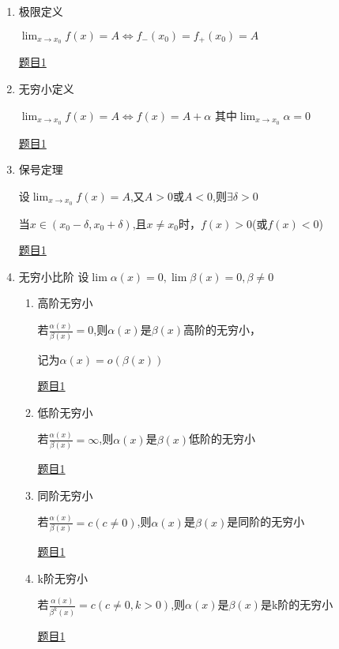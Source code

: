 \documentclass[12pt]{article} %
\begin{document}
\begin{enumerate}
\item 极限定义 
    \par $\displaystyle\lim _{x \rightarrow x_{0}} f(x)=A \Leftrightarrow f_{-}\left(x_{0}\right)=f_{+}\left(x_{0}\right)=A$
    \par \href{https://www.matongxue.com/matex/2576/react/}{题目1}
\item 无穷小定义
    \par $\displaystyle\lim _{x \rightarrow x_{0}} f(x)=A \Leftrightarrow f\left(x\right)=A+\alpha$
    其中$\displaystyle\lim_{x\to x_0}\alpha=0$
    \par \href{https://www.matongxue.com/matex/2575/react/}{题目1} 
\item 保号定理
     \par 设$\displaystyle\lim_{x\to x_0}f(x)=A$,又$A > 0$或$A < 0$,则$\exists\delta > 0$
     \par 当$x\in(x_0-\delta,x_0+\delta)$,且$x\neq x_0$时，$f(x)>0$(或$f(x)<0$)
     \par \href{https://www.matongxue.com/matex/2578/react/}{题目1} 
\item 无穷小比阶
    设$\lim\alpha(x)=0,\lim\beta(x)=0,\beta\neq 0$
    \begin{enumerate}
        \item 高阶无穷小
        \par 若$\displaystyle\frac{\alpha(x)}{\beta(x)}=0$,则$\alpha(x)$是$\beta(x)$高阶的无穷小，
        \par 记为$\alpha(x)=o(\beta(x))$ \quad 
        \par \href{https://www.matongxue.com/matex/2579/react/}{题目1} 
        \item 低阶无穷小
        \par 若$\displaystyle\frac{\alpha(x)}{\beta(x)}=\infty$,则$\alpha(x)$是$\beta(x)$低阶的无穷小
        \par \href{https://www.matongxue.com/matex/2582/react/}{题目1} 
        \item 同阶无穷小
        \par 若$\displaystyle\frac{\alpha(x)}{\beta(x)}=c(c\neq 0)$,则$\alpha(x)$是$\beta(x)$是同阶的无穷小
        \par \href{https://www.matongxue.com/matex/2583/react/}{题目1} 
        \item k阶无穷小
        \par 若$\displaystyle\frac{\alpha(x)}{\beta^k(x)}=c(c\neq 0,k>0)$,则$\alpha(x)$是$\beta(x)$是k阶的无穷小
        \par \href{https://www.matongxue.com/matex/2581/react/}{题目1} 

\end{enumerate}
\end{enumerate}
\end{document}
